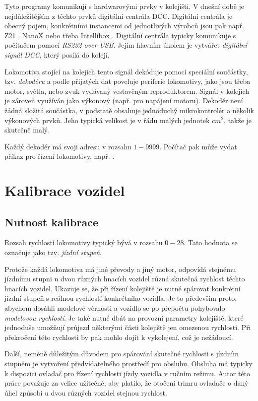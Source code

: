 Tyto programy komunikují s hardwarovými prvky v kolejišti. V dnešní době je
nejdůležitějším z těchto prvků digitální centrála DCC. Digitální centrála je
obecný pojem, konkrétními instancemi od jednotlivých výrobců jsou pak např.
Z21 \cite{}, NanoX \cite{} nebo třeba Intellibox \cite{}. Digitální centrála
typicky komunikuje s počítačem pomocí \textit{RS232 over USB}. Jejím hlavním
úkolem je vytvářet \textit{digitální signál DCC}, který posílá do kolejí.

Lokomotiva stojící na kolejích tento signál dekóduje pomocí speciální součástky,
tzv. \textit{dekodéru} a podle přijatých dat poveluje periferie lokomotivy, jako
jsou třeba motor, světla, nebo zvuk vydávaný vestavěným reproduktorem. Signál
v kolejích je zároveň využíván jako výkonový (např. pro napájení motoru).
Dekodér není žádná složitá součástka, v podstatě obsahuje jednoduchý
mikrokontrolér a několik výkonových prvků. Jeho typická velikost je v řádu
malých jednotek $cm^2$, takže je skutečně malý.

Každý dekodér má svoji adresu v rozsahu $1-9999$. Počítač pak může vydat příkaz
pro řízení lokomotivy, např. \textit{}.

\section{Kalibrace vozidel}

\subsection{Nutnost kalibrace}

Rozsah rychlostí lokomotivy typický bývá v rozsahu $0-28$. Tato hodnota se
označuje jako tzv. \textit{jízdní stupeň}.

Protože každá lokomotiva má jiné převody a jiný motor, odpovídá stejnému
jízdnímu stupni u dvou různých hnacích vozidel různá skutečná rychlost těchto
hnacích vozidel. Ukazuje se, že při řízení kolejiště je nutné spárovat
konkrétní jízdní stupeň s reálnou rychlostí konkrétního vozidla. Je to
především proto, abychom dosáhli modelové věrnosti a vozidlo se po přepočtu
pohybovalo \textit{modelovou rychlostí}. Je také nutné dbát na provozní
parametry kolejiště, které jednoduše umožňují průjezd některými části kolejiště
jen omezenou rychlosti. Při překročení této rychlosti by pak mohlo dojít k
vykolejení, což je nežádoucí.

Další, neméně důležitým důvodem pro spárování skutečné rychlosti s jízdním
stupněm je vytvoření předvídatelného prostředí pro obsluhu. Obsluha má typicky
k dispozici ovladač pro řízení rychlosti jízdy vozidla v ručním režimu. Autor
této práce považuje za velice užitečné, aby platilo, že otočení trimru ovladače
o daný úhel způsobí u dvou různých vozidel stejnou rychlost.

